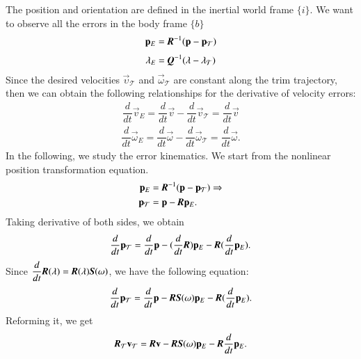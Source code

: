 The position and orientation are defined in the inertial world frame $\lbrace i \rbrace$. We want to observe all the errors in the body frame $\lbrace b \rbrace$
\begin{align}
\vec{p}_{E}=\emph{\textbf{R}}^{-1}(\vec{p}-\vec{p}_{\mathcal{T}}) \label{EQ:NLT3}
\end{align}
\begin{align}
\vec{\lambda}_{E}=\emph{\textbf{Q}}^{-1}(\vec{\lambda}-\vec{\lambda}_{\mathcal{T}}) \label{EQ:NLT4}
\end{align}
Since the desired velocities $\vec{\upsilon}_{\mathcal{T}}$ and $\vec{\omega}_{\mathcal{T}}$ are constant along the trim trajectory, then we can obtain the following relationships for the derivative of velocity errors:
\begin{align}
\dfrac{d}{dt}\vec{v}_{E}=\dfrac{d}{dt}\vec{v}-\dfrac{d}{dt}\vec{v}_{\mathcal{T}}=\dfrac{d}{dt}\vec{v}
\end{align}
\begin{align}
\dfrac{d}{dt}\vec{\omega}_{E}=\dfrac{d}{dt}\vec{\omega}-\dfrac{d}{dt}\vec{\omega}_{\mathcal{T}}=\dfrac{d}{dt}\vec{\omega}.
\end{align}
In the following, we study the error kinematics.
We start from the nonlinear position transformation equation. 
\begin{align}
\vec{p}_{E}&=\emph{\textbf{R}}^{-1}(\vec{p}-\vec{p}_{\mathcal{T}}) \Rightarrow\nonumber \\
\vec{p}_{\mathcal{T}}&=\vec{p}-\emph{\textbf{R}}\vec{p}_{E}.
\end{align}
Taking derivative of both sides, we obtain 
\begin{align}
\dfrac{d}{dt}\vec{p}_{\mathcal{T}}=\dfrac{d}{dt}\vec{p}-(\dfrac{d}{dt}\emph{\textbf{R}})\vec{p}_{E}-\emph{\textbf{R}}(\dfrac{d}{dt}\vec{p}_{E}).
\end{align}
Since $\dfrac{d}{dt}\emph{\textbf{R}}(\vec{\lambda})=\emph{\textbf{R}}(\vec{\lambda})\emph{\textbf{S}}(\vec{\omega})$, we have the following equation:
\begin{align}
\dfrac{d}{dt}\vec{p}_{\mathcal{T}}=\dfrac{d}{dt}\vec{p}-\emph{\textbf{R}}\emph{\textbf{S}}(\vec{\omega})\vec{p}_{E}-\emph{\textbf{R}}(\dfrac{d}{dt}\vec{p}_{E}).
\end{align}
Reforming it, we get
\begin{align}
\emph{\textbf{R}}_{\mathcal{T}}\vec{v}_{\mathcal{T}}=\emph{\textbf{R}}\vec{v}-\emph{\textbf{R}}
\emph{\textbf{S}}(\vec{\omega})\vec{p}_{E}-\emph{\textbf{R}}\dfrac{d}{dt}\vec{p}_{E}.
\end{align}
